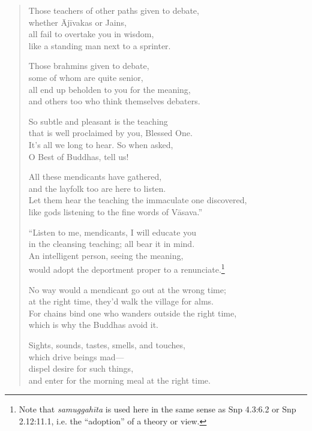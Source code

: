 \documentclass[12pt,openany]{book}%
\begin{document}
\begin{verse}
Those teachers of other paths given to debate, \\
whether \textsanskrit{Ājīvakas} or Jains, \\
all fail to overtake you in wisdom, \\
like a standing man next to a sprinter. 

Those brahmins given to debate, \\
some of whom are quite senior, \\
all end up beholden to you for the meaning, \\
and others too who think themselves debaters. 

So subtle and pleasant is the teaching \\
that is well proclaimed by you, Blessed One. \\
It’s all we long to hear. So when asked, \\
O Best of Buddhas, tell us! 

All these mendicants have gathered, \\
and the layfolk too are here to listen. \\
Let them hear the teaching the immaculate one discovered, \\
like gods listening to the fine words of \textsanskrit{Vāsava}.” 

“Listen to me, mendicants, I will educate you \\
in the cleansing teaching; all bear it in mind. \\
An intelligent person, seeing the meaning, \\
would adopt the deportment proper to a renunciate.\footnote{Note that \textit{\textsanskrit{samuggahīta}} is used here in the same sense as Snp 4.3:6.2 or Snp 2.12:11.1, i.e. the “adoption” of a theory or view. } 

No way would a mendicant go out at the wrong time; \\
at the right time, they’d walk the village for alms. \\
For chains bind one who wanders outside the right time, \\
which is why the Buddhas avoid it. 

Sights, sounds, tastes, smells, and touches, \\
which drive beings mad—\\
dispel desire for such things, \\
and enter for the morning meal at the right time. 


\end{verse}
\end{document}
